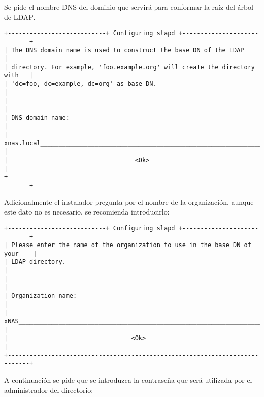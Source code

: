 Se pide el nombre DNS del dominio que servir\'{a} para conformar la ra\'{i}z del \'{a}rbol de \textsc{LDAP}.

{
\scriptsize
\linespread{1}
\begin{verbatim}
+---------------------------+ Configuring slapd +----------------------------+
| The DNS domain name is used to construct the base DN of the LDAP           |
| directory. For example, 'foo.example.org' will create the directory with   |
| 'dc=foo, dc=example, dc=org' as base DN.                                   |
|                                                                            |
| DNS domain name:                                                           |
| xnas.local________________________________________________________________ |
|                                   <Ok>                                     |
+----------------------------------------------------------------------------+
\end{verbatim}
}

Adicionalmente el instalador pregunta por el nombre de la organizaci\'{o}n, aunque este dato no es necesario, se recomienda introducirlo:

{
\scriptsize
\linespread{1}
\begin{verbatim}
+---------------------------+ Configuring slapd +----------------------------+
| Please enter the name of the organization to use in the base DN of your    |
| LDAP directory.                                                            |
|                                                                            |
| Organization name:                                                         |
| xNAS_____________________________________________________________________  |
|                                  <Ok>                                      |
+----------------------------------------------------------------------------+
\end{verbatim}
}

A continuaci\'{o}n se pide que se introduzca la contrase\~{n}a que ser\'{a} utilizada por el administrador del directorio:

